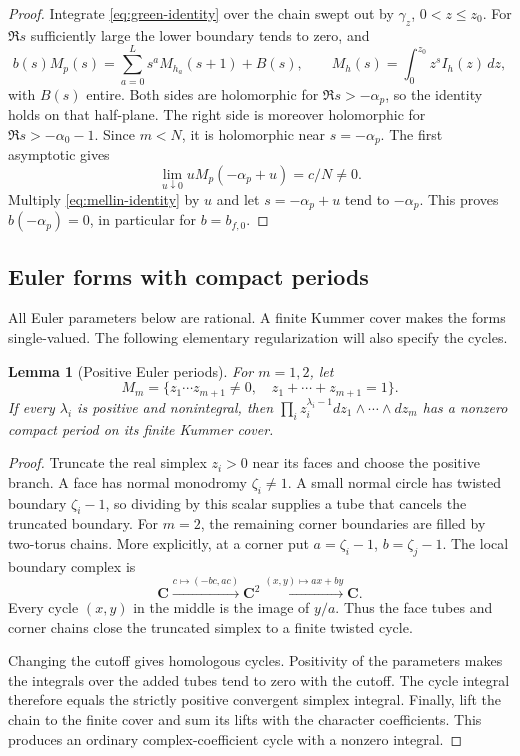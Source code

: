 \documentclass[11pt]{article}
\numberwithin{equation}{section}
\newtheorem{lemma}[theorem]{Lemma}
\theoremstyle{definition}
\theoremstyle{remark}
\newcommand{\CC}{\mathbf C}
\newcommand{\bfzero}{b_{f,0}}
\begin{document}
\begin{proof}
Integrate \eqref{eq:green-identity} over the chain swept out
by $\gamma_z$, $0<z\le z_0$. For $\Re s$ sufficiently
large the lower boundary tends to zero, and
\begin{equation}\label{eq:mellin-identity}
 b(s)M_p(s)=\sum_{a=0}^L s^aM_{h_a}(s+1)+B(s),
 \qquad M_h(s)=\int_0^{z_0}z^sI_h(z)\,dz,
\end{equation}
with $B(s)$ entire. Both sides are holomorphic for
$\Re s>-\alpha_p$, so the identity holds on that half-plane.
The right side is moreover holomorphic for
$\Re s>-\alpha_0-1$. Since $m<N$, it is holomorphic near
$s=-\alpha_p$. The first asymptotic gives
\[
 \lim_{u\downarrow0}uM_p(-\alpha_p+u)=c/N\ne0.
\]
Multiply \eqref{eq:mellin-identity} by $u$ and let
$s=-\alpha_p+u$ tend to $-\alpha_p$. This proves
$b(-\alpha_p)=0$, in particular for $b=\bfzero$.
\end{proof}

\subsection{Euler forms with compact periods}

All Euler parameters below are rational. A finite Kummer
cover makes the forms single-valued. The following elementary
regularization will also specify the cycles.

\begin{lemma}[Positive Euler periods]\label{lem:positive}
For $m=1,2$, let
\[
 M_m=\{z_1\cdots z_{m+1}\ne0,\quad
              z_1+\cdots+z_{m+1}=1\}.
\]
If every $\lambda_i$ is positive and nonintegral, then
$\prod_i z_i^{\lambda_i-1}dz_1\wedge\cdots\wedge dz_m$
has a nonzero compact period on its finite Kummer cover.
\end{lemma}

\begin{proof}
Truncate the real simplex $z_i>0$ near its faces and choose
the positive branch. A face has normal monodromy
$\zeta_i\ne1$. A small normal circle has twisted boundary
$\zeta_i-1$, so dividing by this scalar supplies a tube
that cancels the truncated boundary.
For $m=2$, the remaining corner boundaries are filled by
two-torus chains. More explicitly, at a corner put
$a=\zeta_i-1$, $b=\zeta_j-1$. The local boundary complex is
\[
 \CC\xrightarrow{c\mapsto(-bc,ac)}\CC^2
       \xrightarrow{(x,y)\mapsto ax+by}\CC.
\]
Every cycle $(x,y)$ in the middle is the image of $y/a$.
Thus the face tubes and corner chains close the truncated
simplex to a finite twisted cycle.

Changing the cutoff gives homologous cycles. Positivity of
the parameters makes the integrals over the added tubes
tend to zero with the cutoff. The cycle integral therefore
equals the strictly positive convergent simplex integral.
Finally, lift the chain to the finite cover and sum its lifts
with the character coefficients. This produces an ordinary
complex-coefficient cycle with a nonzero integral.
\end{proof}
\end{document}
